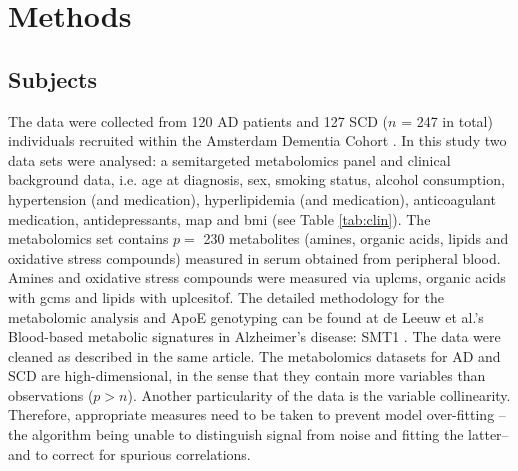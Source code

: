 \documentclass{amsart}
\begin{document}
\newpage
\section{Methods}\label{methods}

\subsection{Subjects}\label{subjects}
The data were collected from 120 AD patients and 127 SCD ($n$ = 247 in total) individuals recruited within the Amsterdam Dementia Cohort \cite{VanDerFlier2018AmsterdamCare, deLeeuw2017Blood-basedDisease}. In this study two data sets were analysed: a semitargeted metabolomics panel and clinical background data, i.e. age at diagnosis, sex, smoking status, alcohol consumption, hypertension (and medication), hyperlipidemia (and medication), anticoagulant medication, antidepressants, \acrfull{map} and \acrfull{bmi} (see Table \ref{tab:clin}). The metabolomics set contains $p =$ 230 metabolites (amines, organic acids, lipids and oxidative stress compounds) measured in serum obtained from peripheral blood. Amines and oxidative stress compounds were measured via \acrfull{uplcms}, organic acids with \acrfull{gcms} and lipids with \acrfull{uplcesitof}. The detailed methodology for the metabolomic analysis and ApoE genotyping can be found at de Leeuw et al.'s  Blood-based metabolic signatures in Alzheimer's disease: SMT1 \cite{deLeeuw2017Blood-basedDisease}. The data were cleaned as described in the same article. The metabolomics datasets for AD and SCD are high-dimensional, in the sense that they contain more variables than observations ($p > n$). Another particularity of the data is the variable collinearity. Therefore, appropriate measures need to be taken to prevent model over-fitting --the algorithm being unable to distinguish signal from noise and fitting the latter--  and to correct for spurious correlations.
\end{document}
